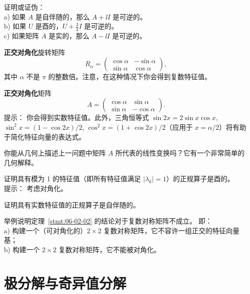 \begin{problemset}
\item \label{ex:06-02-09} 证明或证伪：
\\
a) 如果 $A$ 是自伴随的，那么 $A + \ii I$ 是可逆的。
\\
b) 如果 $U$ 是酉的，$U + \frac{3}{4}I$ 是可逆的。
\\
c) 如果矩阵 $A$ 是实的，那么 $A - \ii I$ 是可逆的。
\item \label{ex:06-02-10} \textbf{正交对角化}旋转矩阵
$$R_\alpha = \begin{pmatrix} \cos \alpha & -\sin \alpha \\ \sin \alpha & \cos \alpha \end{pmatrix},$$
其中 $\alpha$ 不是 $\pi$ 的整数倍。注意，在这种情况下你会得到复数特征值。
\item \label{ex:06-02-11} \textbf{正交对角化}矩阵
$$A = \begin{pmatrix} \cos \alpha & \sin \alpha \\ \sin \alpha & -\cos \alpha \end{pmatrix}.$$
{\heiti 提示：} 你会得到实数特征值。此外，三角恒等式 $\sin 2x = 2 \sin x \cos x$, $\sin^2 x = (1 - \cos 2x)/2$, $\cos^2 x = (1 + \cos 2x)/2$（应用于 $x = \alpha/2$）将有助于简化特征向量的表达式。
\item \label{ex:06-02-12} 你能从几何上描述上一问题中矩阵 $A$ 所代表的线性变换吗？它有一个非常简单的几何解释。
\item \label{ex:06-02-13} 证明具有模为 1 的特征值（即所有特征值满足 $|\lambda_k| = 1$）的正规算子是酉的。\\
{\heiti 提示：} 考虑对角化。
\item \label{ex:06-02-14} 证明具有实数特征值的正规算子是自伴随的。
\item \label{ex:06-02-15} 举例说明定理~\ref{stmt:06-02-02} 的结论对于复数对称矩阵不成立。 即：
\\
    a) 构建一个（可对角化的）$2 \times 2$ 复数对称矩阵，它不容许一组正交的特征向量基；
    \\
    b) 构建一个 $2 \times 2$ 复数对称矩阵，它不能被对角化。
\end{problemset}


\section{极分解与奇异值分解}\label{sec:06-03}


